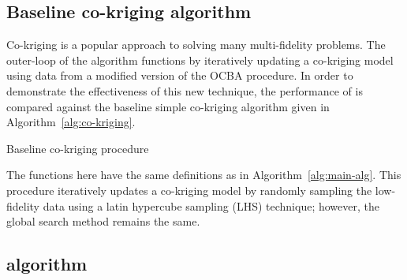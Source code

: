 \subsection{Baseline co-kriging algorithm}
Co-kriging is a popular approach to solving many multi-fidelity problems. The outer-loop of the \AlgName{} algorithm functions by iteratively updating a co-kriging model using data from a modified version of the OCBA procedure. In order to demonstrate the effectiveness of this new technique, the performance of \AlgName{} is compared against the baseline simple co-kriging algorithm given in Algorithm~\ref{alg:co-kriging}.


\begin{algorithm}[h!] 
\caption{Baseline co-kriging procedure}
\label{alg:co-kriging}
{\footnotesize
\begin{algorithmic}[1]
 
  
   
     
  \ENDIF
   
   
   
   
   
\ENDWHILE
\end{algorithmic}
}
\end{algorithm}

The functions here have the same definitions as in Algorithm~\ref{alg:main-alg}. This procedure iteratively updates a co-kriging model by randomly sampling the low-fidelity data using a latin hypercube sampling (LHS) technique; however, the global search method remains the same.

\subsection{\motos{} algorithm}


